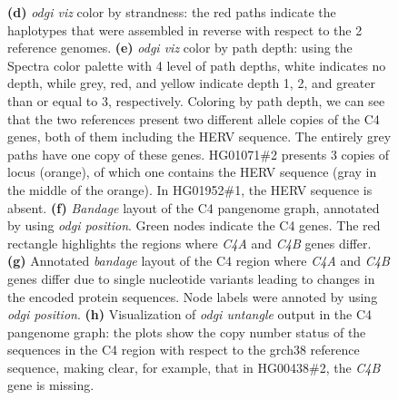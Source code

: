 \begin{figure}[!htb]
{        \textbf{(d)} \textit{odgi viz} color by strandness: the red paths indicate the haplotypes that were assembled in reverse with respect to the 2 reference genomes.
        \textbf{(e)} \textit{odgi viz} color by path depth: using the Spectra color palette with 4 level of path depths, white indicates no depth, while grey, red, and yellow indicate depth 1, 2, and greater than or equal to 3, respectively.
        Coloring by path depth, we can see that the two references present two different allele copies of the C4 genes, both of them including the HERV sequence.
        The entirely grey paths have one copy of these genes.
        HG01071\#2 presents 3 copies of locus (orange), of which one contains the HERV sequence (gray in the middle of the orange).
        In HG01952\#1, the HERV sequence is absent.
        \textbf{(f)} \textit{Bandage} layout of the C4 pangenome graph, annotated by using \textit{odgi position}. Green nodes indicate the C4 genes. The red rectangle highlights the regions where \textit{C4A} and \textit{C4B} genes differ.
        \textbf{(g)} Annotated \textit{bandage} layout of the C4 region where \textit{C4A} and \textit{C4B} genes differ due to single nucleotide variants leading to changes in the encoded protein sequences. Node labels were annoted by using \textit{odgi position}.
        \textbf{(h)} Visualization of \textit{odgi untangle} output in the C4 pangenome graph: the plots show the copy number status of the sequences in the C4 region with respect to the grch38 reference sequence, making clear, for example, that in HG00438\#2, the \textit{C4B} gene is missing. \vspace{-1em}
    }
    \label{fig:odgi_viz}
\end{figure}


